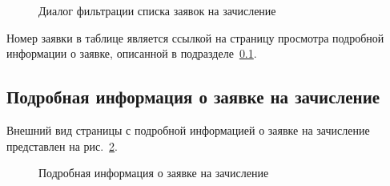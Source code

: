 \begin{figure}[H]
	\caption{Диалог фильтрации списка заявок на зачисление}
	\label{img:student:enroll_req_list_filter}
\end{figure}
Номер заявки в таблице является ссылкой на страницу просмотра подробной информации о заявке, 
описанной в подразделе~\ref{sec:enroll_req_detail}.

\subsection{Подробная информация о заявке на зачисление} \label{sec:enroll_req_detail}
Внешний вид страницы с подробной информацией о заявке на зачисление представлен на рис.~\ref{img:student:enroll_req_detail}.
\begin{figure}[H]
	\caption{Подробная информация о заявке на зачисление}
	\label{img:student:enroll_req_detail}
\end{figure}

